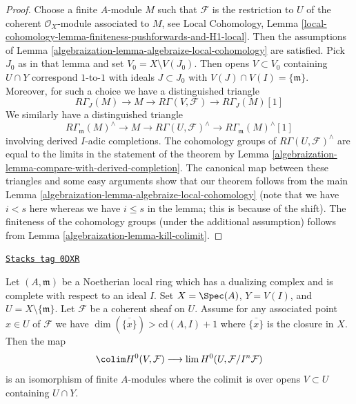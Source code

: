 \begin{proof}

Choose a finite $A$-module $M$ such that $\mathcal{F}$ is the
restriction to $U$ of the
coherent $\mathcal{O}_X$-module associated to $M$, see Local Cohomology,
Lemma \ref{local-cohomology-lemma-finiteness-pushforwards-and-H1-local}.
Then the assumptions of
Lemma \ref{algebraization-lemma-algebraize-local-cohomology}
are satisfied.
Pick $J_0$ as in that lemma and set $V_0 = X \setminus V(J_0)$.
Then opens $V \subset V_0$ containing $U \cap Y$
correspond $1$-to-$1$ with ideals $J \subset J_0$ with
$V(J) \cap V(I) = \{\mathfrak m\}$.
Moreover, for such a choice we have a distinguished triangle
$$
R\Gamma_J(M) \to M \to R\Gamma(V, \mathcal{F}) \to
R\Gamma_J(M)[1]
$$
We similarly have a distinguished triangle
$$
R\Gamma_\mathfrak m(M)^\wedge \to
M \to
R\Gamma(U, \mathcal{F})^\wedge \to
R\Gamma_\mathfrak m(M)^\wedge[1]
$$
involving derived $I$-adic completions.
The cohomology groups of $R\Gamma(U, \mathcal{F})^\wedge$ are
equal to the limits in the statement of the theorem by
Lemma \ref{algebraization-lemma-compare-with-derived-completion}.
The canonical map between these triangles
and some easy arguments show that our
theorem follows from the main Lemma \ref{algebraization-lemma-algebraize-local-cohomology}
(note that we have $i < s$ here whereas we have
$i \leq s$ in the lemma; this is because of the shift).
The finiteness of the cohomology groups
(under the additional assumption) follows from
Lemma \ref{algebraization-lemma-kill-colimit}.
\end{proof}

\begin{lemma}
\label{algebraization-lemma-application-theorem}
\href{https://stacks.math.columbia.edu/tag/0DXR}{\texttt{Stacks tag 0DXR}}

Let $(A, \mathfrak m)$ be a Noetherian local ring which has a
dualizing complex and is complete with respect to an ideal $I$.
Set $X = \Spec(A)$, $Y = V(I)$, and $U = X \setminus \{\mathfrak m\}$.
Let $\mathcal{F}$ be a coherent sheaf on $U$.
Assume for any associated point $x \in U$ of $\mathcal{F}$
we have $\dim(\overline{\{x\}}) > \text{cd}(A, I) + 1$
where $\overline{\{x\}}$ is the closure in $X$.
Then the map
$$
\colim H^0(V, \mathcal{F})
\longrightarrow
\lim H^0(U, \mathcal{F}/I^n\mathcal{F})
$$
is an isomorphism of finite $A$-modules
where the colimit is over opens $V \subset U$
containing $U \cap Y$.
\end{lemma}

